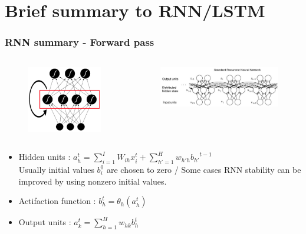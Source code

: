 \documentclass{beamer}
\begin{document}
\section{Brief summary to RNN/LSTM}
\frame
{
    \frametitle{RNN summary - Forward pass}
    \begin{columns}[c]
		\begin{figure}[ht]  
			\begin{center}
				\includegraphics[width=1.6in]{Images/recurrentNN.png}   
			\end{center}   
		\end{figure}
			\begin{figure}[ht]  
    			\begin{center}
    				\includegraphics[width=2.6in]{Images/standard_rnn.png}       			
    			\end{center}
    			\end{figure}
	\end{columns}
    \begin{itemize}
        \item Hidden units : 
        $ a_h^t = {\sum_{i=1}^I} W_{ih}x_i^t + \sum_{h'=1}^H w_{h'h} {b_{h'}}^{t-1} $ \\
        Usually initial values $b_i^0$ are chosen to zero / 
        Some cases RNN stability can be improved by using nonzero initial values.
        \item Actifaction function :
        $ b_h^t = \theta_h(a_h^t) $
        \item Output units : 
        $ a_k^t = \sum_{h=1}^H w_{hk}b_h^t $
    \end{itemize}
}
\frame
\end{document}
